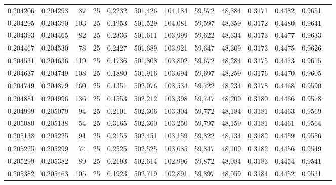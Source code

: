 \begin{tabular}{rrrrrrrrrrrrr}
0.204206 & 0.204293 &    87 &  25 &                                     0.2232 & 501,426 & 104,184 &  59,572 &  48,384 & 0.3171 & 0.4482 & 0.9651 \\
0.204295 & 0.204390 &   103 &  25 &                                     0.1953 & 501,529 & 104,081 &  59,597 &  48,359 & 0.3172 & 0.4480 & 0.9641 \\
0.204393 & 0.204465 &    82 &  25 &                                     0.2336 & 501,611 & 103,999 &  59,622 &  48,334 & 0.3173 & 0.4477 & 0.9633 \\
0.204467 & 0.204530 &    78 &  25 &                                     0.2427 & 501,689 & 103,921 &  59,647 &  48,309 & 0.3173 & 0.4475 & 0.9626 \\
0.204531 & 0.204636 &   119 &  25 &                                     0.1736 & 501,808 & 103,802 &  59,672 &  48,284 & 0.3175 & 0.4473 & 0.9615 \\
0.204637 & 0.204749 &   108 &  25 &                                     0.1880 & 501,916 & 103,694 &  59,697 &  48,259 & 0.3176 & 0.4470 & 0.9605 \\
0.204749 & 0.204879 &   160 &  25 &                                     0.1351 & 502,076 & 103,534 &  59,722 &  48,234 & 0.3178 & 0.4468 & 0.9590 \\
0.204881 & 0.204996 &   136 &  25 &                                     0.1553 & 502,212 & 103,398 &  59,747 &  48,209 & 0.3180 & 0.4466 & 0.9578 \\
0.204999 & 0.205079 &    94 &  25 &                                     0.2101 & 502,306 & 103,304 &  59,772 &  48,184 & 0.3181 & 0.4463 & 0.9569 \\
0.205080 & 0.205138 &    54 &  25 &                                     0.3165 & 502,360 & 103,250 &  59,797 &  48,159 & 0.3181 & 0.4461 & 0.9564 \\
0.205138 & 0.205225 &    91 &  25 &                                     0.2155 & 502,451 & 103,159 &  59,822 &  48,134 & 0.3182 & 0.4459 & 0.9556 \\
0.205225 & 0.205299 &    74 &  25 &                                     0.2525 & 502,525 & 103,085 &  59,847 &  48,109 & 0.3182 & 0.4456 & 0.9549 \\
0.205299 & 0.205382 &    89 &  25 &                                     0.2193 & 502,614 & 102,996 &  59,872 &  48,084 & 0.3183 & 0.4454 & 0.9541 \\
0.205382 & 0.205463 &   105 &  25 &                                     0.1923 & 502,719 & 102,891 &  59,897 &  48,059 & 0.3184 & 0.4452 & 0.9531 \\

\end{tabular}
